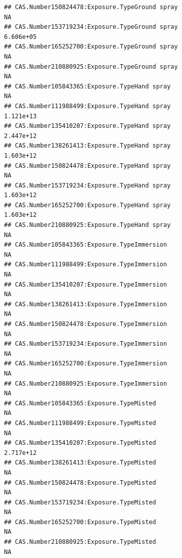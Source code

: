 \documentclass[
  12pt,
]{article}
\begin{document}
\begin{verbatim}
## CAS.Number150824478:Exposure.TypeGround spray                                           NA
## CAS.Number153719234:Exposure.TypeGround spray                                    6.606e+05
## CAS.Number165252700:Exposure.TypeGround spray                                           NA
## CAS.Number210880925:Exposure.TypeGround spray                                           NA
## CAS.Number105843365:Exposure.TypeHand spray                                             NA
## CAS.Number111988499:Exposure.TypeHand spray                                      1.121e+13
## CAS.Number135410207:Exposure.TypeHand spray                                      2.447e+12
## CAS.Number138261413:Exposure.TypeHand spray                                      1.603e+12
## CAS.Number150824478:Exposure.TypeHand spray                                             NA
## CAS.Number153719234:Exposure.TypeHand spray                                      1.603e+12
## CAS.Number165252700:Exposure.TypeHand spray                                      1.603e+12
## CAS.Number210880925:Exposure.TypeHand spray                                             NA
## CAS.Number105843365:Exposure.TypeImmersion                                              NA
## CAS.Number111988499:Exposure.TypeImmersion                                              NA
## CAS.Number135410207:Exposure.TypeImmersion                                              NA
## CAS.Number138261413:Exposure.TypeImmersion                                              NA
## CAS.Number150824478:Exposure.TypeImmersion                                              NA
## CAS.Number153719234:Exposure.TypeImmersion                                              NA
## CAS.Number165252700:Exposure.TypeImmersion                                              NA
## CAS.Number210880925:Exposure.TypeImmersion                                              NA
## CAS.Number105843365:Exposure.TypeMisted                                                 NA
## CAS.Number111988499:Exposure.TypeMisted                                                 NA
## CAS.Number135410207:Exposure.TypeMisted                                          2.717e+12
## CAS.Number138261413:Exposure.TypeMisted                                                 NA
## CAS.Number150824478:Exposure.TypeMisted                                                 NA
## CAS.Number153719234:Exposure.TypeMisted                                                 NA
## CAS.Number165252700:Exposure.TypeMisted                                                 NA
## CAS.Number210880925:Exposure.TypeMisted                                                 NA

\end{verbatim}
\end{document}

